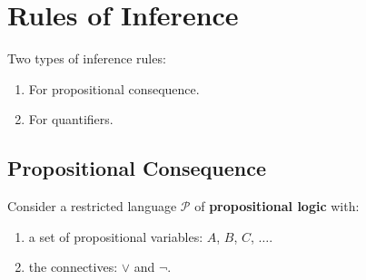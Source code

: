 \documentclass[11pt,letterpaper]{book}
\theoremstyle{definition}
\begin{document}
\section{Rules of Inference}\label{sec:2_4_infer_rules}


Two types of inference rules:
\begin{enumerate}
\item{For propositional consequence.}
\item{For quantifiers.}
\end{enumerate}


\subsection{Propositional Consequence}


Consider a restricted language $\mathcal{P}$ of \textbf{propositional
logic} with:
\begin{enumerate}

\item{a set of propositional variables: $A$, $B$, $C$, $\ldots$.}
\item{the connectives: $\lor$ and $\lnot$.}

\end{enumerate}
\end{document}
